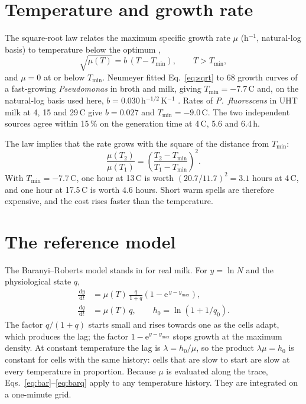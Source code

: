 \documentclass[11pt,a4paper,twoside,openany]{book}
\newcommand{\dd}{\,\mathrm{d}}
\newcommand{\degC}{\,\textdegree C}
\theoremstyle{plain}\newtheorem{proposition}{Proposition}\newtheorem{corollary}{Corollary}
\theoremstyle{definition}\newtheorem{definition}{Definition}[chapter]
\begin{document}
\section{Temperature and growth rate}
The square-root law relates the maximum specific growth rate $\mu$ (h$^{-1}$, natural-log basis) to temperature below the optimum \cite{ratkowsky1982},
\begin{equation}\label{eq:sqrt}
\sqrt{\mu(T)} = b\,(T - T_{\min}), \qquad T > T_{\min},
\end{equation}
and $\mu=0$ at or below $T_{\min}$. Neumeyer fitted Eq.~\eqref{eq:sqrt} to 68 growth curves of a fast-growing \textit{Pseudomonas} in broth and milk, giving $T_{\min}=-7.7$\degC{} and, on the natural-log basis used here, $b=0.030$\,h$^{-1/2}$\,K$^{-1}$ \cite{neumeyer1995}. Rates of \textit{P.~fluorescens} in UHT milk at 4, 15 and 29\degC{} \cite{lin2016} give $b=0.027$ and $T_{\min}=-9.0$\degC. The two independent sources agree within 15\,\% on the generation time at 4\degC{}, 5.6 and 6.4\,h.

The law implies that the rate grows with the square of the distance from $T_{\min}$:
\begin{equation}\label{eq:ratio}
\frac{\mu(T_2)}{\mu(T_1)}=\left(\frac{T_2-T_{\min}}{T_1-T_{\min}}\right)^{2}.
\end{equation}
With $T_{\min}=-7.7$\degC, one hour at 13\degC{} is worth $(20.7/11.7)^2=3.1$ hours at 4\degC, and one hour at 17.5\degC{} is worth 4.6 hours. Short warm spells are therefore expensive, and the cost rises faster than the temperature.

\section{The reference model}
The Baranyi--Roberts model \cite{baranyi1993,baranyi1994} stands in for real milk. For $y=\ln N$ and the physiological state $q$,
\begin{align}
\frac{\dd y}{\dd t} &= \mu(T)\,\frac{q}{1+q}\left(1-\mathrm{e}^{\,y-y_{\max}}\right), \label{eq:bar}\\
\frac{\dd q}{\dd t} &= \mu(T)\,q, \qquad h_0=\ln\!\left(1+1/q_0\right).\label{eq:barq}
\end{align}
The factor $q/(1+q)$ starts small and rises towards one as the cells adapt, which produces the lag; the factor $1-\mathrm{e}^{y-y_{\max}}$ stops growth at the maximum density. At constant temperature the lag is $\lambda=h_0/\mu$, so the product $\lambda\mu=h_0$ is constant for cells with the same history: cells that are slow to start are slow at every temperature in proportion. Because $\mu$ is evaluated along the trace, Eqs.~\eqref{eq:bar}--\eqref{eq:barq} apply to any temperature history. They are integrated on a one-minute grid.
\end{document}
